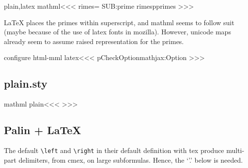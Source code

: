 {{{{{{\<plain,latex mathml\><<<
   {\let\:primes=\empty}
   {\relax \csname SUB:prime\endcsname{}%
   }
   {\let\prime=\relax \xdef\:primes{\:primes\prime}}
>>>

LaTeX places the primes within superscript, and mathml seems to follow
suit (maybe because of the use of latex fonts in mozilla). However,
unicode maps already seem to assume raised representation for the
primes.


\<configure html-mml latex\><<<
\:CheckOption{mathjax}\if:Option
\fi
>>>

\subsection{plain.sty}




\<mathml plain\><<<
   {}
   {}
   {}
   {\IgnorePar{}}
   {}
   {}
>>>

\subsection{Palin + LaTeX}

The default \verb'\left' and \verb'\right' in their default definition
with tex produce multi-part delimiters, from cmex, on large
subformulas. Hence, the `'.' below is needed.

}}}}}}
